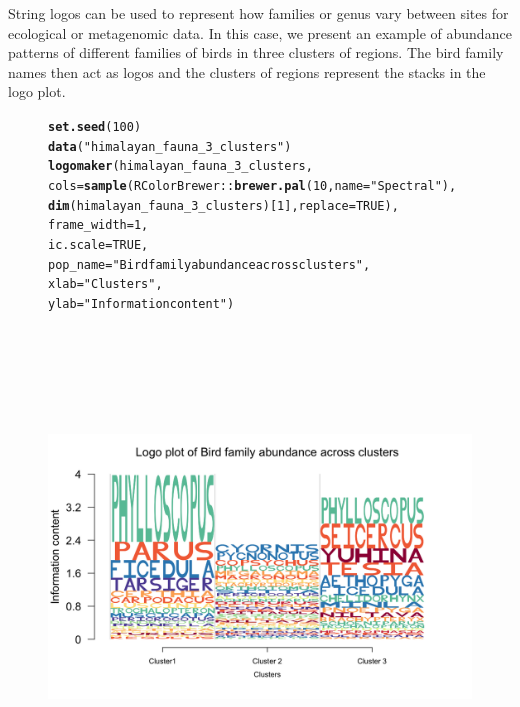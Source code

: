 \documentclass[12pt]{article}\usepackage[]{graphicx}\usepackage[usenames,dvipsnames]{color}
\makeatletter
\newcommand{\hlnum}[1]{\textcolor[rgb]{0.686,0.059,0.569}{#1}}%
\newcommand{\hlstr}[1]{\textcolor[rgb]{0.192,0.494,0.8}{#1}}%
\newcommand{\hlopt}[1]{\textcolor[rgb]{0,0,0}{#1}}%
\newcommand{\hlstd}[1]{\textcolor[rgb]{0.345,0.345,0.345}{#1}}%
\newcommand{\hlkwc}[1]{\textcolor[rgb]{0.333,0.667,0.333}{#1}}%
\newcommand{\hlkwd}[1]{\textcolor[rgb]{0.737,0.353,0.396}{\textbf{#1}}}%
\newenvironment{kframe}{%
 \def\at@end@of@kframe{}%
 \ifinner\ifhmode%
  \def\at@end@of@kframe{\end{minipage}}%
  \begin{minipage}{\columnwidth}%
 \fi\fi%
 \def\FrameCommand##1{\hskip\@totalleftmargin \hskip-\fboxsep
 \colorbox{shadecolor}{##1}\hskip-\fboxsep
     \hskip-\linewidth \hskip-\@totalleftmargin \hskip\columnwidth}%
 \MakeFramed {\advance\hsize-\width
   \@totalleftmargin\z@ \linewidth\hsize
   \@setminipage}}%
 {\par\unskip\endMakeFramed%
 \at@end@of@kframe}
\newenvironment{knitrout}{}{} %
\makeatother
\begin{document}
String logos can be used to represent how families or genus vary between sites for ecological or metagenomic data. In this case, we present an example of abundance patterns of different families of birds in three clusters of regions. The bird family
names then act as logos and the clusters of regions represent the stacks in the logo plot.

\begin{figure}[h]
\begin{center}
\begin{knitrout}
\color{fgcolor}\begin{kframe}
\begin{alltt}
\hlkwd{set.seed}\hlstd{(}\hlnum{100}\hlstd{)}
\hlkwd{data}\hlstd{(}\hlstr{"himalayan_fauna_3_clusters"}\hlstd{)}
\hlkwd{logomaker}\hlstd{(himalayan_fauna_3_clusters,}
          \hlkwc{cols}\hlstd{=} \hlkwd{sample}\hlstd{(RColorBrewer}\hlopt{::}\hlkwd{brewer.pal}\hlstd{(}\hlnum{10}\hlstd{,}\hlkwc{name} \hlstd{=} \hlstr{"Spectral"}\hlstd{),}
                       \hlkwd{dim}\hlstd{(himalayan_fauna_3_clusters)[}\hlnum{1}\hlstd{],} \hlkwc{replace}\hlstd{=}\hlnum{TRUE}\hlstd{),}
          \hlkwc{frame_width} \hlstd{=} \hlnum{1}\hlstd{,}
          \hlkwc{ic.scale} \hlstd{=} \hlnum{TRUE}\hlstd{,}
          \hlkwc{pop_name} \hlstd{=} \hlstr{"Bird family abundance across clusters"}\hlstd{,}
          \hlkwc{xlab} \hlstd{=} \hlstr{"Clusters"}\hlstd{,}
          \hlkwc{ylab} \hlstd{=} \hlstr{"Information content"}\hlstd{)}
\end{alltt}
\end{kframe}
\includegraphics[width=8in,height=5in]{figure/logolas_use_10-1} 

\end{knitrout}
\end{center}
\end{figure}
\end{document}
